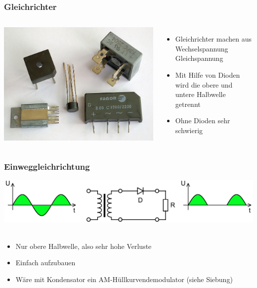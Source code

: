\begin{frame}
  \frametitle{Gleichrichter}
  \begin{columns}[c]
    \begin{center}
      \includegraphics[width=1\textwidth,height=.85\textheight,keepaspectratio]{a05/Brueckengleichrichter_Bilder.jpg}\\
      \tiny \hyperlink{refs}{\cite{wm}}
    \end{center}
    \begin{itemize}
      \item Gleichrichter machen aus Wechselspannung Gleichspannung
      \item Mit Hilfe von Dioden wird die obere und untere Halbwelle getrennt
      \item Ohne Dioden sehr schwierig
    \end{itemize}
  \end{columns}
\end{frame}

\begin{frame}
  \frametitle{Einweggleichrichtung}
  \begin{center}
    \includegraphics[width=1\textwidth,height=.6\textheight,keepaspectratio]{a05/Halfwave_rectifier.png}\\
    \tiny \hyperlink{refs}{\cite{wm}} \\[1em] \large
    \begin{itemize}
      \item Nur obere Halbwelle, also sehr hohe Verluste
      \item Einfach aufzubauen
      \item Wäre mit Kondensator ein AM-Hüllkurvendemodulator (siehe Siebung)
    \end{itemize}
  \end{center}
\end{frame}

